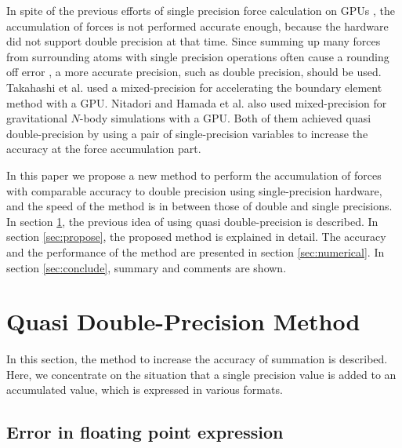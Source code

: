 In spite of the previous efforts of single precision force calculation
on GPUs \cite{NAMD1, NAMD2, GPUneighbor}, the accumulation of forces
is not performed accurate enough, because the hardware did not support
double precision at that time.  Since summing up many forces from
surrounding atoms with single precision operations often cause a
rounding off error \cite{Hamada2}, a more accurate precision, such as
double precision, should be used.  Takahashi et al. \cite{Takahashi1,
Takahashi2} used a mixed-precision for accelerating the boundary
element method with a GPU. Nitadori \cite{Nitadori} and Hamada et
al. \cite{Hamada1} also used mixed-precision for gravitational
$N$-body simulations with a GPU. Both of them achieved quasi
double-precision by using a pair of single-precision variables to
increase the accuracy at the force accumulation part.

In this paper we propose a new method to perform the accumulation of
forces with comparable accuracy to double precision using
single-precision hardware, and the speed of the method is in between
those of double and single precisions.
In section \ref{sec:quasidouble}, the previous idea of using quasi
double-precision is described. In section \ref{sec:propose}, the
proposed method is explained in detail. The accuracy and the
performance of the method are presented in section
\ref{sec:numerical}. In section \ref{sec:conclude}, summary and
comments are shown.

\section{Quasi Double-Precision Method}\label{sec:quasidouble}

In this section, the method to increase the accuracy of 
summation is described. Here, we concentrate on the situation
that a single precision value is added to an accumulated value, 
which is expressed in various formats.

\subsection{Error in floating point expression}

